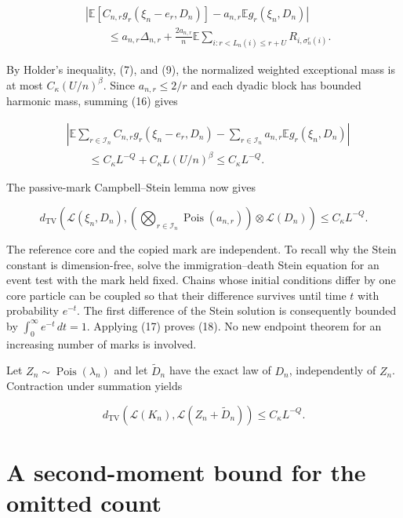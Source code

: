 \documentclass[
  11pt,
]{article}
\begin{document}
\[
\begin{split}
 &\left|\mathbb E[C_{n,r}g_r(\xi_n-e_r,D_n)]
   -a_{n,r}\mathbb Eg_r(\xi_n,D_n)\right|\\
 &\qquad\le a_{n,r}\Delta_{n,r}
 +\frac{2a_{n,r}}n\mathbb E\sum_{i:r<L_n(i)\le r+U}
 R_{i,\sigma_n^r(i)}.
\end{split}
\tag{16}
\]

By Holder's inequality, (7), and (9), the normalized weighted
exceptional mass is at most \(C_\kappa(U/n)^\beta\). Since
\(a_{n,r}\le2/r\) and each dyadic block has bounded harmonic mass,
summing (16) gives

\[
\begin{split}
 &\left|\mathbb E\sum_{r\in\mathcal I_n}C_{n,r}g_r(\xi_n-e_r,D_n)
   -\sum_{r\in\mathcal I_n}a_{n,r}\mathbb Eg_r(\xi_n,D_n)\right|\\
 &\qquad\le C_\kappa L^{-Q}+C_\kappa L(U/n)^\beta
 \le C_\kappa L^{-Q}.
\end{split}
\tag{17}
\]

The passive-mark Campbell--Stein lemma now gives

\[
 d_{\mathrm{TV}}\!\left(
 \mathcal L(\xi_n,D_n),
 \left(\bigotimes_{r\in\mathcal I_n}\operatorname{Pois}(a_{n,r})\right)
 \otimes\mathcal L(D_n)\right)
 \le C_\kappa L^{-Q}.
\tag{18}
\]

The reference core and the copied mark are independent. To recall why
the Stein constant is dimension-free, solve the immigration--death Stein
equation for an event test with the mark held fixed. Chains whose
initial conditions differ by one core particle can be coupled so that
their difference survives until time \(t\) with probability \(e^{-t}\).
The first difference of the Stein solution is consequently bounded by
\(\int_0^\infty e^{-t}\,dt=1\). Applying (17) proves (18). No new
endpoint theorem for an increasing number of marks is involved.

Let \(Z_n\sim\operatorname{Pois}(\lambda_n)\) and let \(\widetilde D_n\)
have the exact law of \(D_n\), independently of \(Z_n\). Contraction
under summation yields

\[
 d_{\mathrm{TV}}\!\left(
 \mathcal L(K_n),\mathcal L(Z_n+\widetilde D_n)\right)
 \le C_\kappa L^{-Q}.
\tag{19}
\]

\section{A second-moment bound for the omitted
count}\label{a-second-moment-bound-for-the-omitted-count}
\end{document}
